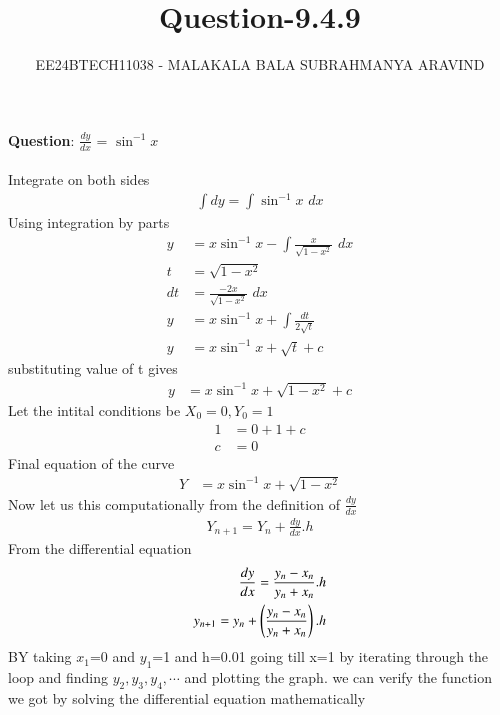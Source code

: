 \documentclass[journal]{IEEEtran}
\numberwithin{equation}{enumi}
\numberwithin{figure}{enumi}
\begin{document}

\title{Question-9.4.9}
\author{EE24BTECH11038 - MALAKALA BALA SUBRAHMANYA ARAVIND}
{\let\newpage\relax\maketitle}
\textbf{Question}:
$\frac{dy}{dx}$ = $\sin^{-1}{x}$\\


\solution \\
Integrate on both sides
\begin{align}
    \int dy=\int \sin^{-1}{x}\,\,dx
\end{align}
Using integration by parts
\begin{align}
    y&=x\sin^{-1}{x}-\int \frac{x}{\sqrt{1-x^{2}}}\,\,dx\\   
    t&=\sqrt{1-x^2}\\
    dt&=\frac{-2x}{\sqrt{1-x^2}}\,\,dx\\
    y&=x\sin^{-1}x+\int \frac{dt}{2\sqrt{t}}\\
    y&=x\sin^{-1}{x}+\sqrt{t}+c
\end{align}
substituting value of t gives
\begin{align}
    y&=x\sin^{-1}{x}+\sqrt{1-x^2}+c
\end{align}
Let the intital conditions be $X_{0}=0,Y_{0}=1$
\begin{align}
    1&=0+1+c\\
    c&=0
\end{align}
Final equation of the curve
\begin{align}
    Y&=x\sin^{-1}{x}+\sqrt{1-x^2}
\end{align}
Now let us  this computationally from the definition of $\frac{dy}{dx}$ 
\begin{align}
    Y_{n+1}=Y_n+\frac{dy}{dx}.h
\end{align}
From the differential equation
\begin{align}
    \frac{dy}{dx}=\frac{y_n-x_n}{y_n+x_n}.h\\
    y_{n+1}=y_n+\left(\frac{y_n-x_n}{y_n+x_n}\right).h
\end{align}
BY taking $x_1$=0 and $y_1$=1 and h=0.01 going till x=1 by iterating through the loop and finding $y_2,y_3,y_4,\cdots$ and plotting the graph. we can verify the function we got by solving the differential equation mathematically
\end{document}
